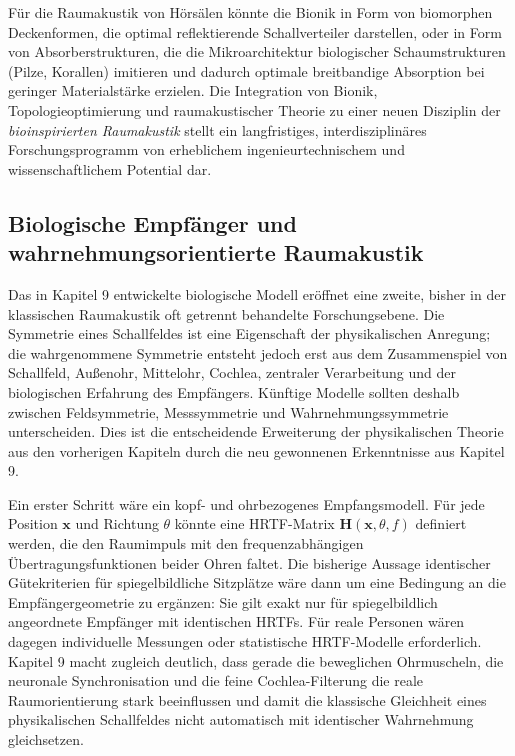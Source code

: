 ﻿\documentclass[12pt, a4paper]{article}
\theoremstyle{definition}
\theoremstyle{remark}
\begin{document}
Für die Raumakustik von Hörsälen könnte die Bionik in Form von
biomorphen Deckenformen, die optimal reflektierende Schallverteiler
darstellen, oder in Form von Absorberstrukturen, die die
Mikroarchitektur biologischer Schaumstrukturen (Pilze, Korallen)
imitieren und dadurch optimale breitbandige Absorption bei geringer
Materialstärke erzielen. Die Integration von Bionik, Topologieoptimierung
und raumakustischer Theorie zu einer neuen Disziplin der
\emph{bioinspirierten Raumakustik} stellt ein langfristiges, interdisziplinäres
Forschungsprogramm von erheblichem ingenieurtechnischem und
wissenschaftlichem Potential dar.

\subsection{Biologische Empfänger und wahrnehmungsorientierte Raumakustik}

Das in Kapitel 9 entwickelte biologische Modell eröffnet eine zweite, bisher in der
klassischen Raumakustik oft getrennt behandelte Forschungsebene. Die Symmetrie eines
Schallfeldes ist eine Eigenschaft der physikalischen Anregung; die wahrgenommene
Symmetrie entsteht jedoch erst aus dem Zusammenspiel von Schallfeld, Außenohr,
Mittelohr, Cochlea, zentraler Verarbeitung und der biologischen Erfahrung des
Empfängers. Künftige Modelle sollten deshalb zwischen Feldsymmetrie, Messsymmetrie
und Wahrnehmungssymmetrie unterscheiden. Dies ist die entscheidende Erweiterung der
physikalischen Theorie aus den vorherigen Kapiteln durch die neu gewonnenen
Erkenntnisse aus Kapitel 9.

Ein erster Schritt wäre ein kopf- und ohrbezogenes Empfangsmodell. Für jede Position
$\mathbf{x}$ und Richtung $\theta$ könnte eine HRTF-Matrix
$\mathbf{H}(\mathbf{x},\theta,f)$ definiert werden, die den Raumimpuls mit den
frequenzabhängigen Übertragungsfunktionen beider Ohren faltet. Die bisherige Aussage
identischer Gütekriterien für spiegelbildliche Sitzplätze wäre dann um eine
Bedingung an die Empfängergeometrie zu ergänzen: Sie gilt exakt nur für spiegelbildlich
angeordnete Empfänger mit identischen HRTFs. Für reale Personen wären dagegen
individuelle Messungen oder statistische HRTF-Modelle erforderlich. Kapitel 9 macht
zugleich deutlich, dass gerade die beweglichen Ohrmuscheln, die neuronale
Synchronisation und die feine Cochlea-Filterung die reale Raumorientierung stark
beeinflussen und damit die klassische Gleichheit eines physikalischen Schallfeldes
nicht automatisch mit identischer Wahrnehmung gleichsetzen.
\end{document}

